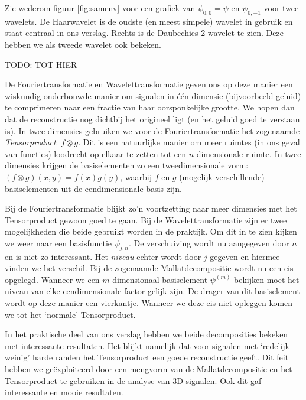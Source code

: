 Zie wederom figuur \ref{fig:samenv} voor een grafiek van $\psi_{0,0} = \psi$ en $\psi_{0,-1}$ voor twee wavelets. De Haarwavelet is de oudste (en meest simpele) wavelet in gebruik en staat centraal in ons verslag. Rechts is de Daubechies-2 wavelet te zien. Deze hebben we als tweede wavelet ook bekeken.

TODO: TOT HIER

De Fouriertransformatie en Wavelettransformatie geven ons op deze manier een wiskundig onderbouwde manier om signalen in \'e\'en dimensie (bijvoorbeeld geluid) te comprimeren naar een fractie van haar oorsponkelijke grootte. We hopen dan dat de reconstructie nog dichtbij het origineel ligt (en het geluid goed te verstaan is). In twee dimensies gebruiken we voor de Fouriertransformatie het zogenaamde \emph{Tensorproduct}: $f \otimes g$. Dit is een natuurlijke manier om meer ruimtes (in ons geval van functies) loodrecht op elkaar te zetten tot een $n$-dimensionale ruimte. In twee dimensies krijgen de basiselementen zo een tweedimensionale vorm: $(f \otimes g)(x,y) = f(x)g(y)$, waarbij $f$ en $g$ (mogelijk verschillende) basiselementen uit de eendimensionale basis zijn.

Bij de Fouriertransformatie blijkt zo'n voortzetting naar meer dimensies met het Tensorproduct gewoon goed te gaan. Bij de Wavelettransformatie zijn er twee mogelijkheden die beide gebruikt worden in de praktijk. Om dit in te zien kijken we weer naar een basisfunctie $\psi_{j,n}$. De verschuiving wordt nu aangegeven door $n$ en is niet zo interessant. Het \emph{niveau} echter wordt door $j$ gegeven en hiermee vinden we het verschil. Bij de zogenaamde Mallatdecompositie wordt nu een eis opgelegd. Wanneer we een $m$-dimensionaal basiselement $\psi^{(m)}$ bekijken moet het niveau van elke eendimensionale factor gelijk zijn. De drager van dit basiselement wordt op deze manier een vierkantje. Wanneer we deze eis niet opleggen komen we tot het `normale' Tensorproduct.

In het praktische deel van ons verslag hebben we beide decomposities bekeken met interessante resultaten. Het blijkt namelijk dat voor signalen met `redelijk weinig' harde randen het Tensorproduct een goede reconstructie geeft. Dit feit hebben we ge\"exploiteerd door een mengvorm van de Mallatdecompositie en het Tensorproduct te gebruiken in de analyse van 3D-signalen. Ook dit gaf interessante en mooie resultaten.

